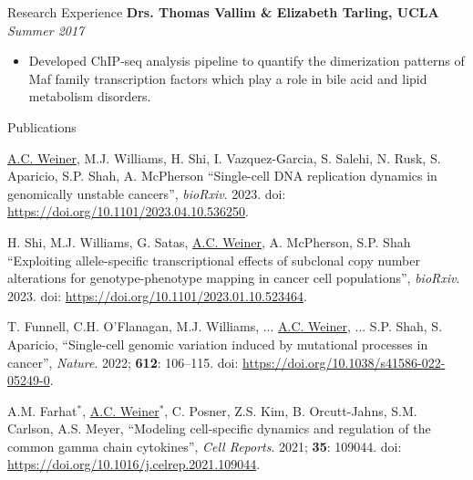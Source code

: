 \documentclass{resume} %
\begin{document}
\begin{rSection}{Research Experience}
{\bf Drs. Thomas Vallim \& Elizabeth Tarling, UCLA} \hfill {\em Summer 2017}
\begin{itemize}
  \item Developed ChIP-seq analysis pipeline to quantify the dimerization patterns of Maf family transcription factors which play a role in bile acid and lipid metabolism disorders.
\end{itemize}

\end{rSection}

\begin{rSection}{Publications}

\underline{A.C. Weiner}, M.J. Williams, H. Shi, I. Vazquez-Garcia, S. Salehi, N. Rusk, S. Aparicio, S.P. Shah, A. McPherson ``Single-cell DNA replication dynamics in genomically unstable cancers'', \textit{bioRxiv}. 2023. doi: \url{https://doi.org/10.1101/2023.04.10.536250}.

H. Shi, M.J. Williams, G. Satas, \underline{A.C. Weiner}, A. McPherson, S.P. Shah ``Exploiting allele-specific transcriptional effects of subclonal copy number alterations for genotype-phenotype mapping in cancer cell populations'', \textit{bioRxiv}. 2023. doi: \url{https://doi.org/10.1101/2023.01.10.523464}.

T. Funnell, C.H. O’Flanagan, M.J. Williams, ... \underline{A.C. Weiner}, ... S.P. Shah, S. Aparicio, ``Single-cell genomic variation induced by mutational processes in cancer'', \textit{Nature}. 2022; \textbf{612}: 106–115. doi: \url{https://doi.org/10.1038/s41586-022-05249-0}.


A.M. Farhat$^{\ast}$, \underline{A.C. Weiner}$^{\ast}$, C. Posner, Z.S. Kim, B. Orcutt-Jahns, S.M. Carlson, A.S. Meyer, ``Modeling cell-specific dynamics and regulation of the common gamma chain cytokines'', \textit{Cell Reports}. 2021; \textbf{35}: 109044. doi: \url{https://doi.org/10.1016/j.celrep.2021.109044}.


\end{rSection}

\end{document}
